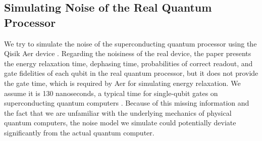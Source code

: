 \subsection{Simulating Noise of the Real Quantum Processor}
We try to simulate the noise of the superconducting quantum processor using the Qisik Aer device \cite{aer}. Regarding the noisiness of the real device, the paper presents the energy relaxation time, dephasing time, probabilities of correct readout, and gate fidelities of each qubit in the real quantum processor, but it does not provide the gate time, which is required by Aer for simulating energy relaxation. We assume it is 130 nanoseconds, a typical time for single-qubit gates on superconducting quantum computers \cite{linke2017experimental}. Because of this missing information and the fact that we are unfamiliar with the underlying mechanics of physical quantum computers, the noise model we simulate could potentially deviate significantly from the actual quantum computer.

